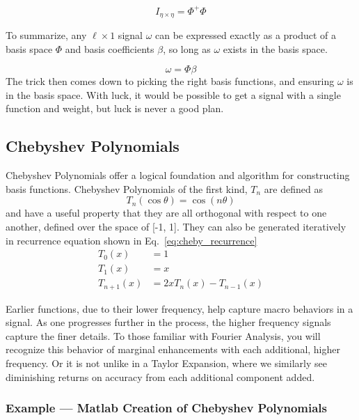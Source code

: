 \begin{equation}
    I_{\eta \times \eta} = \Phi^+ \Phi
    \label{eq:identity_of_basis_spaces}
\end{equation}

To summarize, any $\ell \times 1$ signal $\omega$ can be expressed exactly as a product of a basis space $\Phi$ and basis coefficients $\beta$, so long as $\omega$ exists in the basis space.

\begin{equation}
    \omega = \Phi \beta
    \label{eq:basis_definition}
\end{equation}
The trick then comes down to picking the right basis functions, and ensuring $\omega$ is in the basis space. With luck, it would be possible to get a signal with a single function and weight, but luck is never a good plan.

\FloatBarrier\subsection{Chebyshev Polynomials}
Chebyshev Polynomials offer a logical foundation and algorithm for constructing basis functions. Chebyshev Polynomials of the first kind, $T_n$ are defined as
\begin{equation}
    T_n(\cos \theta) = \cos(n\theta)
    \label{eq:full_cheby_def}
\end{equation}
and have a useful property that they are all orthogonal with respect to one another, defined over the space of [-1, 1]. They can also be generated iteratively in recurrence equation shown in Eq.~\ref{eq:cheby_recurrence}
\begin{align}
    T_0(x) &= 1 \label{eq:cheby_T0}\\
    T_1(x) &= x \label{eq:cheby_T1}\\
    T_{n+1}(x) &= 2xT_n(x) - T_{n-1}(x)\label{eq:cheby_recurrence}
\end{align}

Earlier functions, due to their lower frequency, help capture macro behaviors in a signal. As one progresses further in the process, the higher frequency signals capture the finer details. To those familiar with Fourier Analysis, you will recognize this behavior of marginal enhancements with each additional, higher frequency. Or it is not unlike in a Taylor Expansion, where we similarly see diminishing returns on accuracy from each additional component added. 

\FloatBarrier\subsubsection{Example --- Matlab Creation of Chebyshev Polynomials}

